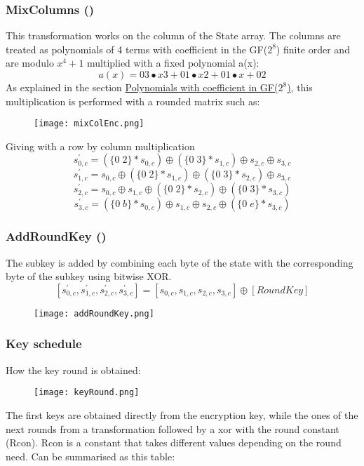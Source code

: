 \documentclass{article}
\begin{document}
\subsubsection{MixColumns ()}
This transformation works on the column of the State array. The columns are treated as polynomials of 4 terms with coefficient in the GF($2^8$) finite order and are modulo $x^4+1$ multiplied with a fixed polynomial a(x):
 \[a(x) = {03}•x3 + {01}•x2+ {01}•x + {02}\]
As explained in the section \hyperref[sec:polyGF]{Polynomials with coefficient in GF($2^8$)}, this multiplication is performed with a rounded matrix such as:
\begin{figure}[htb]
	\begin{center}
  		\texttt{[image: mixColEnc.png]} 
 	\end{center}
\end{figure}
Giving with a row by column multiplication
\[s^{'}_{0,c} = (\{0\;2\} * s_{0,c}) \oplus  (\{0\;3\} * s_{1,c}) \oplus  s_{2,c} \oplus  s_{3,c}\]
\[s^{'}_{1,c} = s_{0,c} \oplus  (\{0\;2\} * s_{1,c}) \oplus  (\{0\;3\} * s_{2,c}) \oplus  s_{3,c}\]
\[s^{'}_{2,c}= s_{0,c} \oplus    s_{1,c} \oplus (\{0\;2\} * s_{2,c}) \oplus (\{0\;3\} * s_{3,c} )\]
\[s^{'}_{3,c}= (\{0\;b\} * s_{0,c} ) \oplus  s_{1,c} \oplus  s_{2,c} \oplus  (\{0\;e\} * s_{3,c} )\]

\subsubsection{AddRoundKey ()}
The subkey is added by combining each byte of the state with the corresponding byte of the subkey using bitwise XOR.
 \[[ s^{'}_{0,c} , s^{'}_{1,c} , s^{'}_{2,c} , s^{'}_{3,c} ] = [ s_{0,c} , s_{1,c} , s_{2,c} , s_{3,c} ] \oplus [  RoundKey ] \]

\begin{figure}[htb]
	\begin{center}
  		\texttt{[image: addRoundKey.png]} 
 	\end{center}
\end{figure}

\subsubsection{Key schedule}
How the key round is obtained:
\begin{figure}[htb]
	\begin{center}
  		\texttt{[image: keyRound.png]} 
 	\end{center}
\end{figure}
The first keys are obtained directly from the encryption key, while the ones of the next rounds from a transformation followed by a xor with the round constant (Rcon). Rcon is a constant that takes different values depending on the round need. Can be summarised as this table:
\end{document}
